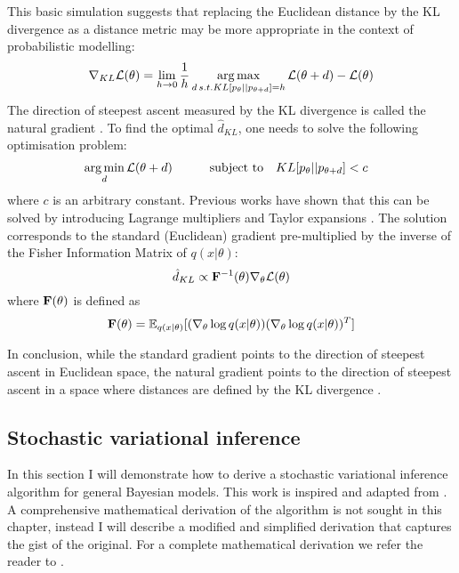 This basic simulation suggests that replacing the Euclidean distance by the KL divergence as a distance metric may be more appropriate in the context of probabilistic modelling:
\[
	\nabla_{KL} \mathcal{L}(\theta) = \lim_{h\to0} \frac{1}{h}\operatorname*{arg\,max}_{d \, s.t. KL[p_\theta||p_{\theta+d}]=h} \mathcal{L}(\theta+d) - \mathcal{L}(\theta)
\]
The direction of steepest ascent measured by the KL divergence is called the natural gradient \cite{Amari1998,Martens2014}. To find the optimal $\hat{d}_{KL}$, one needs to solve the following optimisation problem:
\begin{equation*} \begin{aligned}
	&\operatorname*{arg\,min}_{d} \mathcal{L}(\theta+d) \qquad
	& \text{subject to}
	& \quad KL[p_\theta||p_{\theta+d}] < c
\end{aligned} \end{equation*}
where $c$ is an arbitrary constant. Previous works have shown that this can be solved by introducing Lagrange multipliers and Taylor expansions \cite{Amari1998,Kristiadi2019}. The solution corresponds to the standard (Euclidean) gradient pre-multiplied by the inverse of the Fisher Information Matrix of $q(x|\theta)$:
\begin{equation}\label{natural_gradient}
	\hat{d}_{KL} \propto {\bf F}^{-1}(\theta) \nabla_{\theta} \mathcal{L}(\theta)
\end{equation}
where ${\bf F}(\theta)$ is defined as
\[
	{\bf F}(\theta) = \mathbb{E}_{q(x|\theta)}[(\nabla_\theta \log q(x|\theta)) (\nabla_\theta \log q(x|\theta))^T]
\]


In conclusion, while the standard gradient points to the direction of steepest ascent in Euclidean space, the natural gradient points to the direction of steepest ascent in a space where distances are defined by the KL divergence \cite{Kristiadi2019,Amari1998,Hoffman2012}.


\subsection{Stochastic variational inference} \label{section:stochastic_variational_inference}

In this section I will demonstrate how to derive a stochastic variational inference algorithm for general Bayesian models. This work is inspired and adapted from \cite{Hoffman2012}. A comprehensive mathematical derivation of the algorithm is not sought in this chapter, instead I will describe a modified and simplified derivation that captures the gist of the original. For a complete mathematical derivation we refer the reader to \cite{Hoffman2012}.

